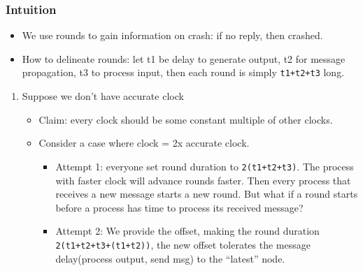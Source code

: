 \documentclass[11pt]{article}
\begin{document}
\subsubsection{Intuition}
\label{sec:org3ff8c98}
\begin{itemize}
  \item We use rounds to gain information on crash: if no reply, then crashed.
  \item How to delineate rounds: let t1 be delay to generate output, t2 for message
        propagation, t3 to process input, then each round is simply \texttt{t1+t2+t3} long.
\end{itemize}
\begin{enumerate}
  \item Suppose we don't have accurate clock
        \label{sec:org9620598}
        \begin{itemize}
          \item Claim: every clock should be some constant multiple of other clocks.
          \item Consider a case where clock = 2x accurate clock.
                \begin{itemize}
                  \item Attempt 1: everyone set round duration to \texttt{2(t1+t2+t3)}. The process with
                        faster clock will advance rounds faster. Then every process that receives a
                        new message starts a new round. But what if a round starts before a process
                        has time to process its received message?
                  \item Attempt 2: We provide the offset, making the round duration
                        \texttt{2(t1+t2+t3+(t1+t2))}, the new offset tolerates the message delay(process
                        output, send msg) to the ``latest'' node.
                \end{itemize}
        \end{itemize}
\end{enumerate}
\end{document}
